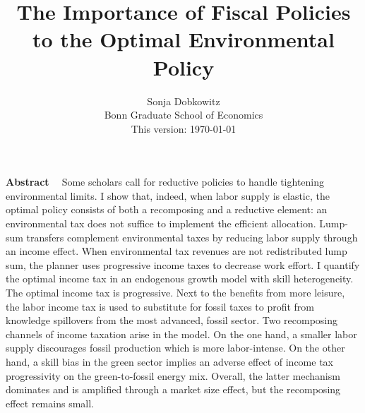\documentclass[12pt]{article}
\title{The Importance of Fiscal Policies to the Optimal Environmental Policy}
\date{Sonja Dobkowitz\\ Bonn Graduate School of Economics\\ %
\vspace{1mm}
This version: \today }
\renewenvironment{abstract}
{\small
	\list{}{
		\setlength{\leftmargin}{0.025\textwidth}%
		\setlength{\rightmargin}{\leftmargin}%
	}%
	\item\relax}
{\endlist}
\begin{document}
%	
	\maketitle
	\begin{abstract}
		\begin{singlespacing}
			\textbf{Abstract \ }
			Some scholars call for reductive policies to handle tightening environmental limits. I show that, indeed, when labor supply is elastic, 
			the optimal policy consists of both a recomposing and a reductive element: an environmental tax does not suffice to implement the efficient allocation. Lump-sum transfers complement environmental taxes by reducing labor supply through an income effect.
			 When environmental tax revenues are not redistributed lump sum, the planner uses progressive income taxes to decrease work effort. %
			I quantify the optimal income tax in an endogenous growth model with skill heterogeneity. The optimal income tax is progressive. Next to the benefits from more leisure, the labor income tax is used to substitute for fossil taxes to profit from knowledge spillovers from the most advanced, fossil sector. Two recomposing channels of income taxation arise in the model. On the one hand, a smaller labor supply discourages fossil production which is more labor-intense. On the other hand, a skill bias in the green sector implies an adverse effect of income tax progressivity on the green-to-fossil energy mix. Overall, the latter mechanism dominates and is amplified through a market size effect, but the recomposing effect remains small.

\end{singlespacing}
\end{abstract}
\end{document}
